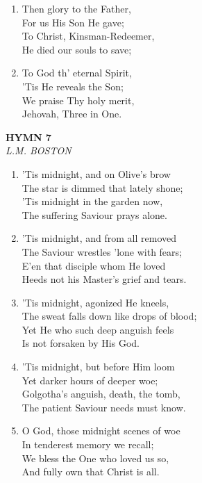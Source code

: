 \begin{enumerate}
    \item Then glory to the Father, \\
        For us His Son He gave; \\
        To Christ, Kinsman-Redeemer, \\
        He died our souls to save;

    \item To God th' eternal Spirit, \\
        'Tis He reveals the Son; \\
        We praise Thy holy merit, \\
        Jehovah, Three in One.

\end{enumerate}

\newpage
\begin{center}
    {\Large \textbf{HYMN 7}}
    \\
    \textit{L.M. BOSTON}
\end{center}
\vspace{1em}

\begin{enumerate}
    \item 'Tis midnight, and on Olive's brow \\
        The star is dimmed that lately shone; \\
        'Tis midnight in the garden now, \\
        The suffering Saviour prays alone.

    \item 'Tis midnight, and from all removed \\
        The Saviour wrestles 'lone with fears; \\
        E'en that disciple whom He loved \\
        Heeds not his Master's grief and tears.

    \item 'Tis midnight, agonized He kneels, \\
        The sweat falls down like drops of blood; \\
        Yet He who such deep anguish feels \\
        Is not forsaken by His God.

    \item 'Tis midnight, but before Him loom \\
        Yet darker hours of deeper woe; \\
        Golgotha's anguish, death, the tomb, \\
        The patient Saviour needs must know.

    \item O God, those midnight scenes of woe \\
        In tenderest memory we recall; \\
        We bless the One who loved us so, \\
        And fully own that Christ is all.

\end{enumerate}

